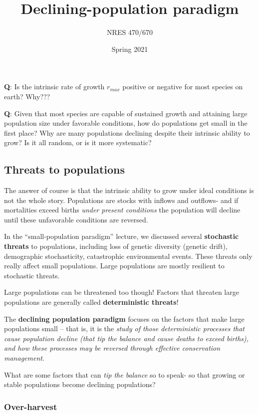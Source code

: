 \documentclass[
]{article}
\title{Declining-population paradigm}
\author{NRES 470/670}
\date{Spring 2021}
\begin{document}
\maketitle

{
\setcounter{tocdepth}{2}
\tableofcontents
}
\textbf{Q}: Is the intrinsic rate of growth \(r_{max}\) positive or
negative for most species on earth? Why???

\textbf{Q}: Given that most species are capable of sustained growth and
attaining large population size under favorable conditions, how do
populations get small in the first place? Why are many populations
declining despite their intrinsic ability to grow? Is it all random, or
is it more systematic?

\hypertarget{threats-to-populations}{%
\subsection{Threats to populations}\label{threats-to-populations}}

The answer of course is that the intrinsic ability to grow under ideal
conditions is not the whole story. Populations are stocks with inflows
and outflows- and if mortalities exceed births \emph{under present
conditions} the population will decline until these unfavorable
conditions are reversed.

In the ``small-population paradigm'' lecture, we discussed several
\textbf{stochastic threats} to populations, including loss of genetic
diversity (genetic drift), demographic stochasticity, catastrophic
environmental events. These threats only really affect small
populations. Large populations are mostly resilient to stochastic
threats.

Large populations can be threatened too though! Factors that threaten
large populations are generally called \textbf{deterministic threats}!

The \textbf{declining population paradigm} focuses on the factors that
make large populations small -- that is, it is the \emph{study of those
deterministic processes that cause population decline (that tip the
balance and cause deaths to exceed births), and how these processes may
be reversed through effective conservation management}.

What are some factors that can \emph{tip the balance} so to speak- so
that growing or stable populations become declining populations?

\hypertarget{over-harvest}{%
\subsubsection{Over-harvest}\label{over-harvest}}
\end{document}
